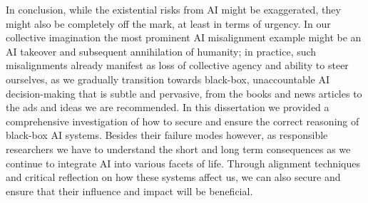 In conclusion, while the existential risks from AI might be exaggerated, they might also be completely off the mark, at least in terms of urgency.
In our collective imagination the most prominent \gls{AI} misalignment example might be an AI takeover and subsequent annihilation of humanity; in practice, such misalignments already manifest as loss of collective agency and ability to steer ourselves, as we gradually transition towards black-box, unaccountable \gls{AI} decision-making that is subtle and pervasive, from the books and news articles to the ads and ideas we are recommended.
In this dissertation we provided a comprehensive investigation of how to secure and ensure the correct reasoning of black-box \gls{AI} systems.
Besides their failure modes however, as responsible researchers we have to understand the short and long term consequences as we continue to integrate AI into various facets of life.
Through alignment techniques and critical reflection on how these systems affect us, we can also secure and ensure that their influence and impact will be beneficial.

\cleardoublepage